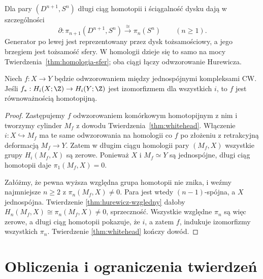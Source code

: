 \begin{przyklad}
\label{prz:pi-dysk-brzeg}
Dla pary $(D^{n+1},S^n)$
długi ciąg homotopii
i ściągalność dysku
dają w szczególności
\[
 \partial:
 \pi_{n+1}(D^{n+1},S^n)
 \xrightarrow{\ \cong\ }
 \pi_n(S^n)
 \qquad(n\geq1).
\]
Generator po lewej jest reprezentowany przez dysk tożsamościowy,
a jego brzegiem jest
tożsamość sfery.
W homologii dzieje się
to samo na mocy
Twierdzenia~\ref{thm:homologia-sfer};
oba ciągi łączy odwzorowanie
Hurewicza.
\end{przyklad}

\begin{wniosek}
\label{cor:whitehead-homologiczny}
Niech $f:X\to Y$ będzie odwzorowaniem
między jednospójnymi
kompleksami CW.
Jeśli
$f_*:H_i(X;\Z)\to H_i(Y;\Z)$
jest izomorfizmem
dla wszystkich $i$,
to $f$ jest
równoważnością
homotopijną.
\end{wniosek}
\begin{proof}
Zastępujemy $f$
odwzorowaniem komórkowym
homotopijnym z nim
i tworzymy cylinder
$M_f$ z dowodu
Twierdzenia~\ref{thm:whitehead}.
Włączenie
$i:X\hookrightarrow M_f$
ma te same odwzorowania
na homologii co $f$
po złożeniu z
retrakcyjną deformacją
$M_f\to Y$.
Zatem w długim
ciągu homologii
pary $(M_f,X)$
wszystkie grupy
$H_i(M_f,X)$
są zerowe.
Ponieważ $X$
i $M_f\simeq Y$
są jednospójne,
długi ciąg homotopii
daje
$\pi_1(M_f,X)=0$.

Załóżmy, że pewna
wyższa względna
grupa homotopii
nie znika, i weźmy
najmniejsze $n\geq2$
z $\pi_n(M_f,X)\ne0$.
Para jest wtedy
$(n-1)$-spójna,
a $X$ jednospójna.
Twierdzenie
\ref{thm:hurewicz-wzgledny}
dałoby
$H_n(M_f,X)\cong
\pi_n(M_f,X)\ne0$,
sprzeczność.
Wszystkie względne
$\pi_n$ są więc
zerowe, a długi
ciąg homotopii
pokazuje, że
$i$, a zatem $f$,
indukuje izomorfizmy
wszystkich $\pi_n$.
Twierdzenie
\ref{thm:whitehead}
kończy dowód.
\end{proof}

\section{Obliczenia i ograniczenia twierdzeń}
\label{sec:pi-przyklady}

